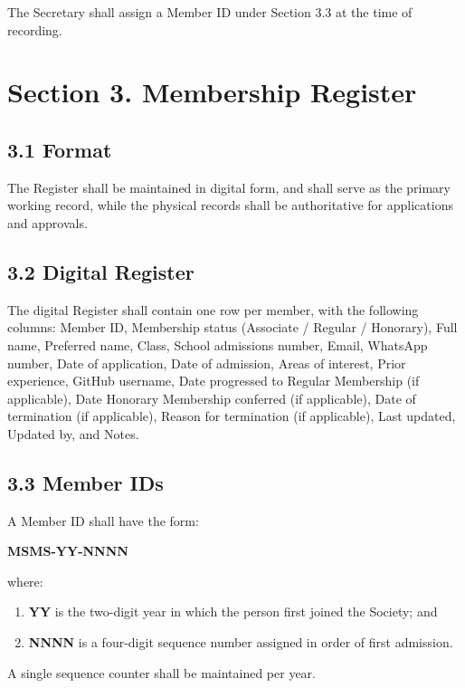 \documentclass[a4paper]{article}
\begin{document}
The Secretary shall assign a Member ID under Section 3.3 at the
time of recording.

\section*{Section 3. Membership Register}

\subsection*{3.1 Format}
The Register shall be maintained in digital form, and shall serve as the primary working record, while the
physical records shall be authoritative for applications and approvals.

\subsection*{3.2 Digital Register}
The digital Register shall contain one row per member, with the
following columns: Member ID, Membership status (Associate / Regular /
Honorary), Full name, Preferred name, Class, School admissions number,
Email, WhatsApp number, Date of application, Date of admission, Areas
of interest, Prior experience, GitHub username, Date progressed to
Regular Membership (if applicable), Date Honorary Membership conferred
(if applicable), Date of termination (if applicable), Reason for
termination (if applicable), Last updated, Updated by, and Notes.

\subsection*{3.3 Member IDs}
A Member ID shall have the form:

\begin{center}
\textbf{MSMS-YY-NNNN}
\end{center}

where:
\begin{enumerate}
  \item \textbf{YY} is the two-digit year in which the person first joined the Society; and
  \item \textbf{NNNN} is a four-digit sequence number assigned in order of first admission.
\end{enumerate}

A single sequence
counter shall be maintained per year.
\end{document}
